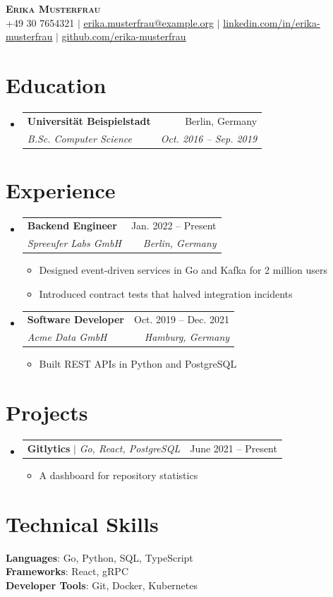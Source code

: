 \documentclass[letterpaper,11pt]{article}
\makeatletter
\newcommand{\resumeItem}[1]{
  \item\small{
    {#1 \vspace{-2pt}}
  }
}
\newcommand{\resumeSubheading}[4]{
  \vspace{-2pt}\item
    \begin{tabular*}{0.97\textwidth}[t]{l@{\extracolsep{\fill}}r}
      \textbf{#1} & #2 \\
      \textit{\small#3} & \textit{\small #4} \\
    \end{tabular*}\vspace{-7pt}
}
\newcommand{\resumeProjectHeading}[2]{
    \item
    \begin{tabular*}{0.97\textwidth}{l@{\extracolsep{\fill}}r}
      \small#1 & #2 \\
    \end{tabular*}\vspace{-7pt}
}
\newcommand{\resumeSubHeadingListStart}{\begin{itemize}[leftmargin=0.15in, label={}]}
\newcommand{\resumeSubHeadingListEnd}{\end{itemize}}
\newcommand{\resumeItemListStart}{\begin{itemize}}
\newcommand{\resumeItemListEnd}{\end{itemize}\vspace{-5pt}}
\makeatother
\begin{document}
\begin{center}
    \textbf{\Huge \scshape Erika Musterfrau} \\ \vspace{1pt}
    \small +49 30 7654321 $|$ \href{mailto:erika.musterfrau@example.org}{\underline{erika.musterfrau@example.org}} $|$
    \href{https://linkedin.com/in/erika-musterfrau}{\underline{linkedin.com/in/erika-musterfrau}} $|$
    \href{https://github.com/erika-musterfrau}{\underline{github.com/erika-musterfrau}}
\end{center}

\section{Education}
  \resumeSubHeadingListStart
    \resumeSubheading
      {Universit\"at Beispielstadt}{Berlin, Germany}
      {B.Sc. Computer Science}{Oct. 2016 -- Sep. 2019}
  \resumeSubHeadingListEnd

\section{Experience}
  \resumeSubHeadingListStart
    \resumeSubheading
      {Backend Engineer}{Jan. 2022 -- Present}
      {Spreeufer Labs GmbH}{Berlin, Germany}
      \resumeItemListStart
        \resumeItem{Designed event-driven services in Go and Kafka for 2 million users}
        \resumeItem{Introduced contract tests that halved integration incidents}
      \resumeItemListEnd

    \resumeSubheading
      {Software Developer}{Oct. 2019 -- Dec. 2021}
      {Acme Data GmbH}{Hamburg, Germany}
      \resumeItemListStart
        \resumeItem{Built REST APIs in Python and PostgreSQL}
      \resumeItemListEnd
  \resumeSubHeadingListEnd

\section{Projects}
    \resumeSubHeadingListStart
      \resumeProjectHeading
          {\textbf{Gitlytics} $|$ \emph{Go, React, PostgreSQL}}{June 2021 -- Present}
          \resumeItemListStart
            \resumeItem{A dashboard for repository statistics}
          \resumeItemListEnd
    \resumeSubHeadingListEnd

\section{Technical Skills}
 \begin{itemize}[leftmargin=0.15in, label={}]
    \small{\item{
     \textbf{Languages}{: Go, Python, SQL, TypeScript} \\
     \textbf{Frameworks}{: React, gRPC} \\
     \textbf{Developer Tools}{: Git, Docker, Kubernetes}
    }}
 \end{itemize}
\end{document}

